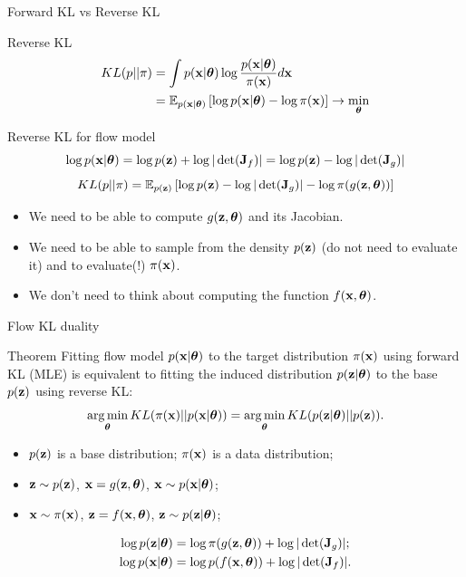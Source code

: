 \begin{frame}{Forward KL vs Reverse KL}
	\begin{block}{Reverse KL}
	  	\vspace{-0.5cm}
			\begin{align*}
				KL(p || \pi) &= \int p(\mathbf{x} | \boldsymbol{\theta}) \log \frac{p(\mathbf{x} | \boldsymbol{\theta})}{\pi(\mathbf{x})} d \mathbf{x} \\
				&= \mathbb{E}_{p(\mathbf{x} | \boldsymbol{\theta})} \left[\log p(\mathbf{x} | \boldsymbol{\theta}) - \log \pi(\mathbf{x})\right] \rightarrow \min_{\boldsymbol{\theta}}
			\end{align*}
		\vspace{-0.7cm}
	\end{block}
	\begin{block}{Reverse KL for flow model}
  		\vspace{-0.3cm}
		\[
			 \log p(\mathbf{x} | \boldsymbol{\theta}) = \log p(\mathbf{z}) +  \log  |\det (\mathbf{J}_f)| = \log p(\mathbf{z}) - \log |\det (\mathbf{J}_g)| 
		\]
		\[
			KL(p || \pi)  = \mathbb{E}_{p(\mathbf{z})} \left[  \log p(\mathbf{z}) -  \log |\det (\mathbf{J}_g)| - \log \pi(g(\mathbf{z}, \boldsymbol{\theta})) \right]
		\]
		\begin{itemize}
		\item We need to be able to compute $g(\mathbf{z}, \boldsymbol{\theta})$ and its Jacobian.
		\item We need to be able to sample from the density $p(\mathbf{z})$ (do not need to evaluate it) and to evaluate(!) $\pi(\mathbf{x})$.
		\item We don’t need to think about computing the function $f(\mathbf{x}, \boldsymbol{\theta})$.
		\end{itemize}
	\end{block}
\end{frame}
\begin{frame}{Flow KL duality}
	\begin{block}{Theorem}
		Fitting flow model $p(\mathbf{x}| \boldsymbol{\theta})$ to the target distribution $\pi(\mathbf{x})$ using forward KL (MLE) is equivalent to fitting the induced distribution $p(\mathbf{z}| \boldsymbol{\theta})$ to the base $p(\mathbf{z})$ using reverse KL:
		\[
			\operatorname*{arg\,min}_{\boldsymbol{\theta}} KL(\pi(\mathbf{x}) || p(\mathbf{x} | \boldsymbol{\theta})) = \operatorname*{arg\,min}_{\boldsymbol{\theta}} KL(p(\mathbf{z} | \boldsymbol{\theta}) || p(\mathbf{z})).
		\]
		\vspace{-0.3cm}
		\begin{itemize}
			\item $p(\mathbf{z})$ is a base distribution; $\pi(\mathbf{x})$ is a data distribution;
			\item $\mathbf{z} \sim p(\mathbf{z})$, $\mathbf{x} = g(\mathbf{z}, \boldsymbol{\theta})$, $\mathbf{x} \sim p(\mathbf{x}| \boldsymbol{\theta})$;
			\item $\mathbf{x} \sim \pi(\mathbf{x})$, $\mathbf{z} = f(\mathbf{x}, \boldsymbol{\theta})$, $\mathbf{z} \sim p(\mathbf{z} | \boldsymbol{\theta})$;
		\end{itemize}
		\begin{align*}
			\log p(\mathbf{z} | \boldsymbol{\theta}) &= \log \pi(g(\mathbf{z}, \boldsymbol{\theta})) + \log | \det ( \mathbf{J}_g) |; \\
			\log p(\mathbf{x} | \boldsymbol{\theta}) &= \log p(f(\mathbf{x}, \boldsymbol{\theta})) + \log | \det ( \mathbf{J}_f) |.
		\end{align*}
	\end{block}
\end{frame}
